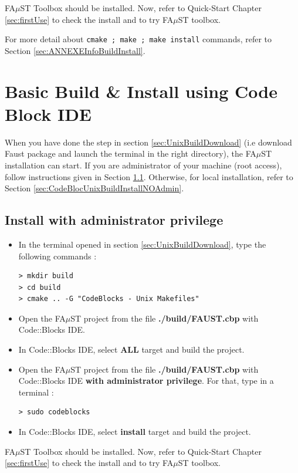 FA$\mu$ST Toolbox should be installed. Now, refer to Quick-Start Chapter \ref{sec:firstUse} to check the install and to try FA$\mu$ST toolbox.

For more detail about \texttt{cmake ; make ; make install} commands, refer to Section \ref{sec:ANNEXEInfoBuildInstall}.


\section{Basic Build \& Install using Code Block IDE}\label{sec:UnixInstallCodeBlock}
When you have done the step in section  \ref{sec:UnixBuildDownload} (i.e download Faust package and launch the terminal in the right directory),  the FA$\mu$ST installation can start. If you are administrator of your machine (root access), follow instructions given in Section \ref{sec:CodeBlocUnixBuildInstallAdmin}. Otherwise, for local installation, refer to Section \ref{sec:CodeBlocUnixBuildInstallNOAdmin}. 

\subsection{Install with administrator privilege}\label{sec:CodeBlocUnixBuildInstallAdmin}
\begin{itemize}
\item In the terminal opened in section 
\ref{sec:UnixBuildDownload}, type the following commands : 
\begin{lstlisting}
> mkdir build
> cd build
> cmake .. -G "CodeBlocks - Unix Makefiles"
\end{lstlisting}

\item Open the FA$\mu$ST project from the file \textbf{./build/FAUST.cbp} with Code::Blocks IDE. 
\item In Code::Blocks IDE, select \textbf{ALL} target and build the project. 
\item Open the FA$\mu$ST project from the file \textbf{./build/FAUST.cbp} with Code::Blocks IDE \textbf{with administrator privilege}. For that, type in a terminal :
\begin{lstlisting}
> sudo codeblocks
\end{lstlisting}
\item In Code::Blocks IDE, select \textbf{install} target and build the project. 
\end{itemize}

FA$\mu$ST Toolbox should be installed. Now, refer to Quick-Start Chapter \ref{sec:firstUse} to check the install and to try FA$\mu$ST toolbox.

